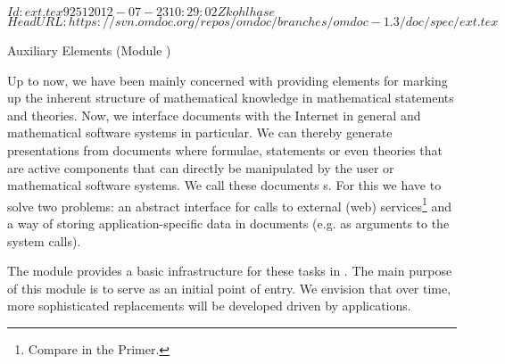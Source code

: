 \svnInfo $Id: ext.tex 9251 2012-07-23 10:29:02Z kohlhase $
\svnKeyword $HeadURL: https://svn.omdoc.org/repos/omdoc/branches/omdoc-1.3/doc/spec/ext.tex $

\begin{tchapter}[id=ext,short=Auxiliary Elements]{Auxiliary Elements (Module {})}

  Up to now, we have been mainly concerned with providing elements for marking up the
  inherent structure of mathematical knowledge in mathematical statements and
  theories. Now, we interface {\omdoc} documents with the Internet in general and
  mathematical software systems in particular. We can thereby generate presentations from
  {\omdoc} documents where formulae, statements or even theories that are active
  components that can directly be manipulated by the user or mathematical software
  systems. We call these documents {s}.  For this we have to
  solve two problems: an abstract interface for calls to external (web)
  services\footnote{Compare {} in the {\omdoc} Primer.} and a way of
  storing application-specific data in {\omdoc} documents (e.g. as arguments to the system
  calls).

  The module {} provides a basic infrastructure for these tasks in
  {\omdoc}. The main purpose of this module is to serve as an initial point of entry. We
  envision that over time, more sophisticated replacements will be developed driven by
  applications.


\end{tchapter}
